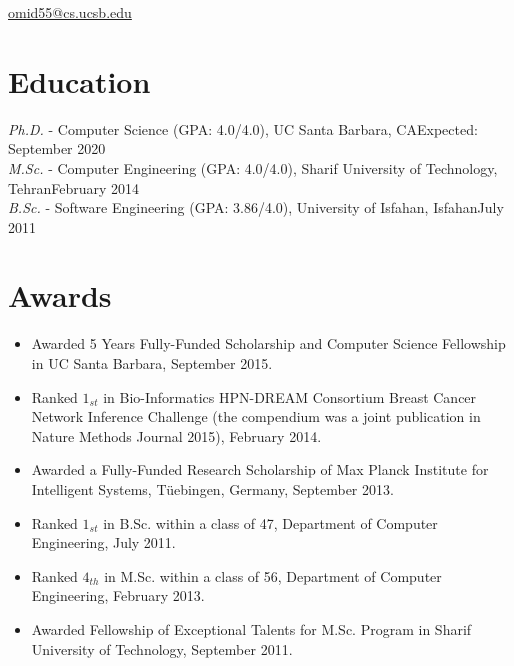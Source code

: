 \documentclass[letter]{res}
\begin{document}
\newif \iflong
\longtrue     %

\address{+1 (805) 886 7101}
\address{6520 El Colegio Rd, Apt 2308, Santa Barbara, CA 93106} \href{mailto:omid55@cs.ucsb.edu}{omid55@cs.ucsb.edu}
\begin{resume}
  \noindent\makebox[\linewidth]{\rule{\paperwidth}{0.4pt}}


\section{Education}
{\sl Ph.D.} - Computer Science (GPA: 4.0/4.0), UC Santa Barbara, CA\hfill Expected: September 2020\vspace{-1mm}\\
{\sl M.Sc.} - Computer Engineering (GPA: 4.0/4.0), Sharif University of Technology, Tehran\hfill February 2014\vspace{-1mm}\\
{\sl B.Sc.} - Software Engineering (GPA: 3.86/4.0), University of Isfahan, Isfahan\hfill July 2011\vspace{-1mm}


\section{Awards} 
 \begin{itemize}
 \item Awarded 5 Years Fully-Funded Scholarship and Computer Science Fellowship in UC Santa Barbara, September 2015.
 \item Ranked $1_{st}$ in Bio-Informatics HPN-DREAM Consortium Breast Cancer Network Inference Challenge (the compendium was a joint publication in Nature Methods Journal 2015), February 2014.
 \item Awarded a Fully-Funded Research Scholarship of Max Planck Institute for Intelligent Systems, Tüebingen, Germany, September 2013.
 \item Ranked $1_{st}$ in B.Sc. within a class of 47, Department of Computer Engineering, July 2011.
 \item Ranked $4_{th}$ in M.Sc. within a class of 56, Department of Computer Engineering, February 2013.
 \item Awarded Fellowship of Exceptional Talents for M.Sc. Program in Sharif University of Technology, September 2011.
\end{itemize}



\end{resume}
\end{document}
